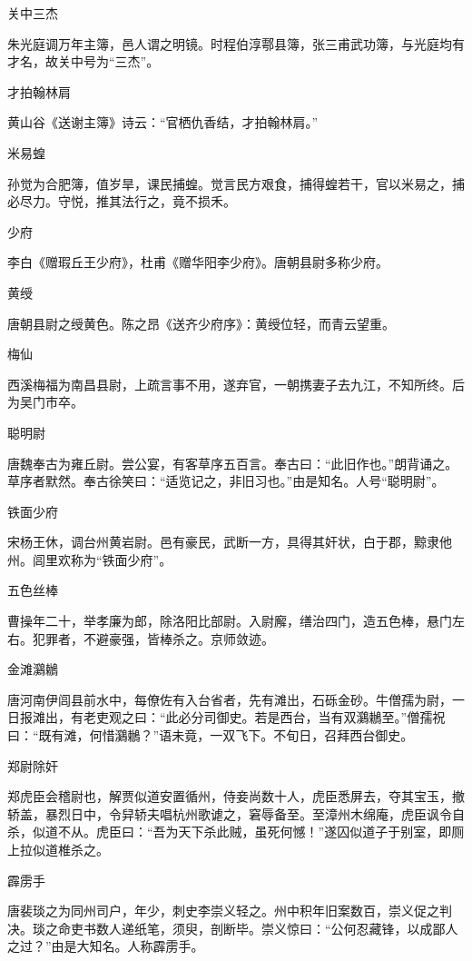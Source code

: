 \documentclass[a4paper,12pt,UTF8,twoside]{ctexbook}
\begin{document}
    关中三杰
    
    朱光庭调万年主簿，邑人谓之明镜。时程伯淳鄠县簿，张三甫武功簿，与光庭均有才名，故关中号为“三杰”。
    
    才拍翰林肩
    
    黄山谷《送谢主簿》诗云：“官栖仇香结，才拍翰林肩。”
    
    米易蝗
    
    孙觉为合肥簿，值岁旱，课民捕蝗。觉言民方艰食，捕得蝗若干，官以米易之，捕必尽力。守悦，推其法行之，竟不损禾。
    
    少府
    
    李白《赠瑕丘王少府》，杜甫《赠华阳李少府》。唐朝县尉多称少府。
    
    黄绶
    
    唐朝县尉之绶黄色。陈之昂《送齐少府序》：黄绶位轻，而青云望重。
    
    梅仙
    
    西溪梅福为南昌县尉，上疏言事不用，遂弃官，一朝携妻子去九江，不知所终。后为吴门市卒。
    
    聪明尉
    
    唐魏奉古为雍丘尉。尝公宴，有客草序五百言。奉古曰：“此旧作也。”朗背诵之。草序者默然。奉古徐笑曰：“适览记之，非旧习也。”由是知名。人号“聪明尉”。
    
    铁面少府
    
    宋杨王休，调台州黄岩尉。邑有豪民，武断一方，具得其奸状，白于郡，黥隶他州。闾里欢称为“铁面少府”。
    
    五色丝棒
    
    曹操年二十，举孝廉为郎，除洛阳比部尉。入尉廨，缮治四门，造五色棒，悬门左右。犯罪者，不避豪强，皆棒杀之。京师敛迹。
    
    金滩鸂鶒
    
    唐河南伊闾县前水中，每僚佐有入台省者，先有滩出，石砾金砂。牛僧孺为尉，一日报滩出，有老吏观之曰：“此必分司御史。若是西台，当有双鸂鶒至。”僧孺祝曰：“既有滩，何惜鸂鶒？”语未竟，一双飞下。不旬日，召拜西台御史。
    
    郑尉除奸
    
    郑虎臣会稽尉也，解贾似道安置循州，侍妾尚数十人，虎臣悉屏去，夺其宝玉，撤轿盖，暴烈日中，令舁轿夫唱杭州歌谑之，窘辱备至。至漳州木绵庵，虎臣讽令自杀，似道不从。虎臣曰：“吾为天下杀此贼，虽死何憾！”遂囚似道子于别室，即厕上拉似道椎杀之。
    
    霹雳手
    
    唐裴琰之为同州司户，年少，刺史李崇义轻之。州中积年旧案数百，崇义促之判决。琰之命吏书数人递纸笔，须臾，剖断毕。崇义惊曰：“公何忍藏锋，以成鄙人之过？”由是大知名。人称霹雳手。
    
\end{document}
